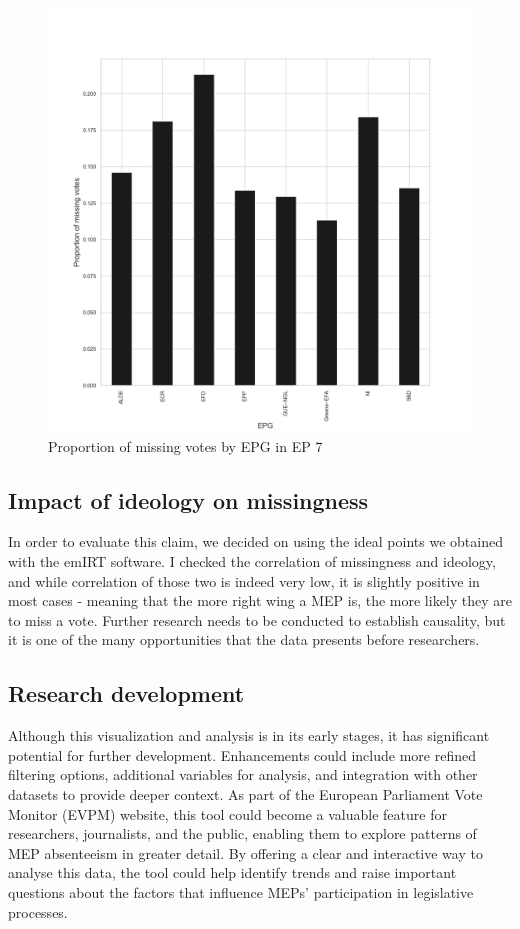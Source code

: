 \documentclass{article}
\begin{document}
    \begin{figure}[htb]
        \centering
        \includegraphics[width=\textwidth]{Graphs/proportions_report.png}
        \caption{Proportion of missing votes by EPG in EP 7}
        \label{fig:proportions}
    \end{figure}

    \subsection{Impact of ideology on missingness}
    In order to evaluate this claim, we decided on using the ideal points we obtained with the emIRT software. I
    checked the correlation of missingness and ideology, and while correlation of those two is indeed very low, it
    is slightly positive in most cases - meaning that the more right wing a MEP is, the more likely they are to miss
    a vote. Further research needs to be conducted to establish causality, but it is one of the many opportunities
    that the data presents before researchers.

    \subsection{Research development}
    Although this visualization and analysis is in its early stages, it has significant potential for further
    development.
    Enhancements could include more refined filtering options, additional variables for analysis, and integration with
    other datasets to provide deeper context. As part of the European Parliament Vote Monitor (EVPM) website, this tool
    could become a valuable feature for researchers, journalists, and the public, enabling them to explore patterns of
    MEP absenteeism in greater detail. By offering a clear and interactive way to analyse this data, the tool could help
    identify trends and raise important questions about the factors that influence MEPs' participation in legislative
    processes.
\end{document}
